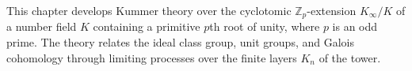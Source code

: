 This chapter develops Kummer theory over the cyclotomic $\mathbb{Z}_p$-extension $K_\infty/K$ of a number field $K$ containing a primitive $p$th root of unity, where $p$ is an odd prime. The theory relates the ideal class group, unit groups, and Galois cohomology through limiting processes over the finite layers $K_n$ of the tower.
